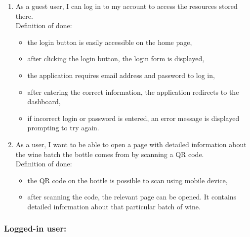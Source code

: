 \begin{enumerate}
	\\Definition of done:
	\begin{itemize}
	\item there is a recovery form with input field for email address,
	\item the system sends an email with a unique reset link,
	\item it is possible to set a new password that meets the security strength requirements after clicking the reset link,
	\item the password hash is updated in the database.
	\end{itemize}
	\item As a guest user, I can log in to my account to access the resources stored there.
	\\Definition of done:
	\begin{itemize}
		\item the login button is easily accessible on the home page,
		\item after clicking the login button, the login form is displayed,
		\item the application requires email address and password to log in,
		\item after entering the correct information, the application redirects to the dashboard,
		\item if incorrect login or password is entered, an error message is displayed prompting to try again.
	\end{itemize}
	\item As a user, I want to be able to open a page with detailed information about the wine batch the bottle comes from by scanning a QR code.
	\\Definition of done:
	\begin{itemize}
		\item the QR code on the bottle is possible to scan using mobile device,
		\item after scanning the code, the relevant page can be opened. It contains detailed information about that particular batch of wine.
	\end{itemize}
\end{enumerate}

\subsubsection{Logged-in user:}

